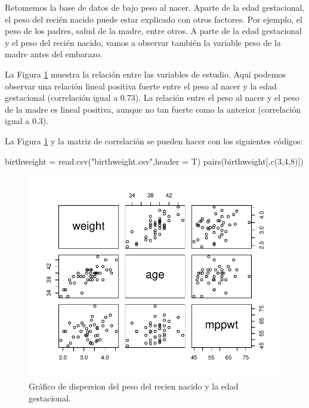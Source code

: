 \documentclass[
]{article}
\newenvironment{Shaded}{\begin{snugshade}}{\end{snugshade}}
\newcommand{\AttributeTok}[1]{\textcolor[rgb]{0.77,0.63,0.00}{#1}}
\newcommand{\DecValTok}[1]{\textcolor[rgb]{0.00,0.00,0.81}{#1}}
\newcommand{\FunctionTok}[1]{\textcolor[rgb]{0.00,0.00,0.00}{#1}}
\newcommand{\NormalTok}[1]{#1}
\newcommand{\OtherTok}[1]{\textcolor[rgb]{0.56,0.35,0.01}{#1}}
\newcommand{\StringTok}[1]{\textcolor[rgb]{0.31,0.60,0.02}{#1}}
\begin{document}
Retomemos la base de datos de bajo peso al nacer. Aparte de la edad gestacional, el peso del recién nacido puede estar explicado con otros factores. Por ejemplo, el peso de los padres, salud de la madre, entre otros. A parte de la edad gestacional y el peso del recién nacido, vamos a observar también la variable peso de la madre antes del embarazo.

La Figura \ref{fig:BWdataFig} muestra la relación entre las variables de estudio. Aquí podemos observar una relación lineal positiva fuerte entre el peso al nacer y la edad gestacional (correlación igual a 0.73). La relación entre el peso al nacer y el peso de la madre es lineal positiva, aunque no tan fuerte como la anterior (correlación igual a 0.3).

La Figura \ref{fig:BWdataFig} y la matriz de correlación se pueden hacer con los siguientes códigos:

\begin{Shaded}
\begin{Highlighting}[]
\NormalTok{birthweight }\OtherTok{=} \FunctionTok{read.csv}\NormalTok{(}\StringTok{"birthweight.csv"}\NormalTok{,}\AttributeTok{header =}\NormalTok{ T)}
\FunctionTok{pairs}\NormalTok{(birthweight[,}\FunctionTok{c}\NormalTok{(}\DecValTok{3}\NormalTok{,}\DecValTok{4}\NormalTok{,}\DecValTok{8}\NormalTok{)])}
\end{Highlighting}
\end{Shaded}

\begin{figure}

{\centering \includegraphics{MLGI_files/figure-latex/BWdataFig-1} 

}

\caption{Gráfico de dispersion del peso del recien nacido y la edad gestacional.}\label{fig:BWdataFig}
\end{figure}
\end{document}
